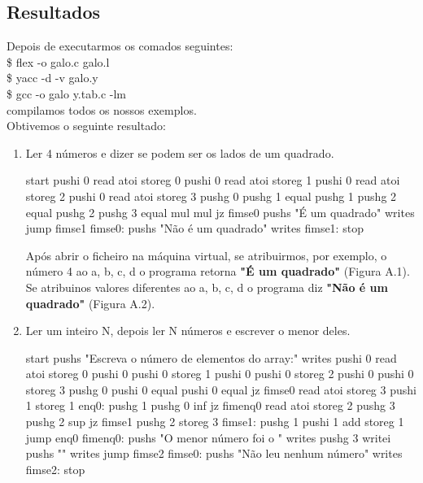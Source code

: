 \documentclass{report}
\begin{document}
\subsection{Resultados}
\indent
Depois de executarmos os comados seguintes:\\
\noindent
\$ flex -o galo.c galo.l\\
\$ yacc -d -v galo.y\\
\$ gcc -o galo y.tab.c -lm\\
compilamos todos os nossos exemplos.\\
\indent
Obtivemos o seguinte resultado:
\begin{enumerate}
	\item Ler 4 números e dizer se podem ser os lados de um quadrado.
	\begin{code}
		
	start
	pushi 0
	read
	atoi
	storeg 0
	pushi 0
	read
	atoi
	storeg 1
	pushi 0
	read
	atoi
	storeg 2
	pushi 0
	read
	atoi
	storeg 3
	pushg 0
	pushg 1
	equal
	pushg 1
	pushg 2
	equal
	pushg 2
	pushg 3
	equal
	mul
	mul
	jz fimse0
	pushs "É um quadrado\n"
	writes
	jump fimse1
	fimse0:
	pushs "Não é um quadrado\n"
	writes
	fimse1:
	stop
	
	\end{code}
	\indent
	Após abrir o ficheiro na máquina virtual, se atribuirmos, por exemplo, o número 4 ao a, b, c, d o programa retorna \textbf{"É um quadrado"} (Figura A.1). Se atribuinos valores diferentes ao a, b, c, d o programa diz \textbf{"Não é um quadrado"} (Figura A.2).
	
	
	\item Ler um inteiro N, depois ler N números e escrever o menor deles.
	
	\begin{code}
		start
		pushs "Escreva o número de elementos do array:\n"
		writes
		pushi 0
		read
		atoi
		storeg 0
		pushi 0
		pushi 0
		storeg 1
		pushi 0
		pushi 0
		storeg 2
		pushi 0
		pushi 0
		storeg 3
		pushg 0
		pushi 0
		equal
		pushi 0
		equal
		jz fimse0
		read
		atoi
		storeg 3
		pushi 1
		storeg 1
		enq0:
		pushg 1
		pushg 0
		inf
		jz fimenq0
		read
		atoi
		storeg 2
		pushg 3
		pushg 2
		sup
		jz fimse1
		pushg 2
		storeg 3
		fimse1:
		pushg 1
		pushi 1
		add
		storeg 1
		jump enq0
		fimenq0:
		pushs "O menor número foi o "
		writes
		pushg 3
		writei
		pushs "\n"
		writes
		jump fimse2
		fimse0:
		pushs "Não leu nenhum número\n"
		writes
		fimse2:
		stop
		
	\end{code}


\end{enumerate}
\end{document}
